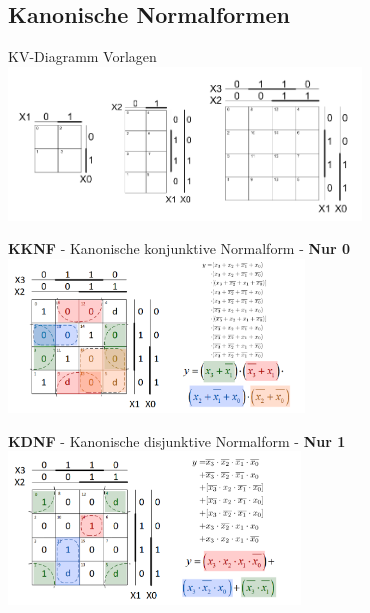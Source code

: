 \subsection{Kanonische Normalformen}
\noindent\begin{minipage}{\textwidth}
	KV-Diagramm Vorlagen\\
	\includegraphics[height=11em]{./Images/DNF-3i-Diagram.png}
\end{minipage}

\noindent\begin{minipage}{\textwidth}
	\textbf{KKNF} - Kanonische konjunktive Normalform - \textbf{Nur 0}\\
	\includegraphics[height=11em]{./Images/KNF-Diagram.png}
\end{minipage}

\noindent\begin{minipage}{\textwidth}
	\textbf{KDNF} - Kanonische disjunktive Normalform - \textbf{Nur 1}\\
	\includegraphics[height=11em]{./Images/DNF-Diagram.png}
\end{minipage}

